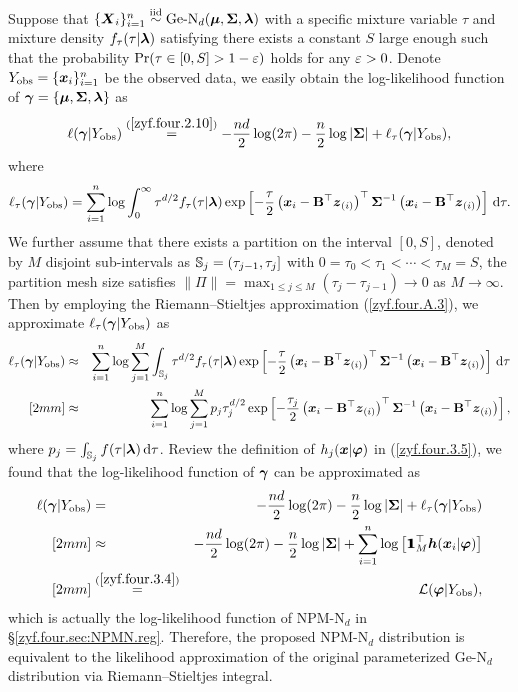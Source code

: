 Suppose that $\{{\boldsymbol{X}}_i\}_{i=1}^n \stackrel{{\rm iid}}{\sim} \mbox{Ge-N}_d({\boldsymbol{\mu}}, {\mbox{\boldmath$\Sigma$}}, {\boldsymbol{\lambda}})$ with a specific mixture variable $\tau$ and mixture density $f_\tau(\tau|{\boldsymbol{\lambda}})$ satisfying there exists a constant $S$ large enough such that the probability $\Pr(\tau \in [0, S] > 1 - \varepsilon)$ holds for any $\varepsilon > 0$. Denote $Y_{\rm obs} = \{{\boldsymbol{x}}_i\}_{i=1}^n$ be the observed data, we easily obtain the log-likelihood function of ${\boldsymbol{\gamma}} = \{{\boldsymbol{\mu}}, {\mbox{\boldmath$\Sigma$}}, {\boldsymbol{\lambda}}\}$ as
\begin{eqnarray} \label{zyf.four.3.8}
    \ell({\boldsymbol{\gamma}} | Y_{\rm obs}) \stackrel{(\ref{zyf.four.2.10})}{=} -\frac{nd}{2}\log(2\pi) - \frac{n}{2}\log|{\mbox{\boldmath$\Sigma$}}| + \ell_\tau({\boldsymbol{\gamma}} | Y_{\rm obs}),
\end{eqnarray}
where
\begin{eqnarray*}
    \ell_\tau({\boldsymbol{\gamma}} | Y_{\rm obs}) = \sum_{i=1}^n \log \int_0^\infty \tau^{d / 2} f_\tau(\tau|{\boldsymbol{\lambda}}) \exp\left[-\frac{\tau}{2} \left({\boldsymbol{x}}_i - {\bf B}^\top{\boldsymbol{z}}_{(i)} \right)^\top {\mbox{\boldmath$\Sigma$}}^{-1} \left({\boldsymbol{x}}_i - {\bf B}^\top{\boldsymbol{z}}_{(i)} \right)\right] \,\mbox{d} \tau.
\end{eqnarray*}
We further assume that there exists a partition on the interval $[0, S]$, denoted by $M$ disjoint sub-intervals as ${\mathbb{S}}_j = (\tau_{j - 1}, \tau_j]$ with $0 = \tau_0 < \tau_1 < \cdots < \tau_M = S$, the partition mesh size satisfies $\|\Pi\| = \max_{1 \le j \le M} (\tau_j - \tau_{j - 1}) \to 0$ as $M \to \infty$. Then by employing the Riemann--Stieltjes approximation (\ref{zyf.four.A.3}), we approximate $\ell_\tau({\boldsymbol{\gamma}} | Y_{\rm obs})$ as
\begin{eqnarray*}
    \ell_\tau({\boldsymbol{\gamma}} | Y_{\rm obs}) &\approx& \sum_{i=1}^n \log \sum_{j=1}^M \int_{{\mathbb{S}}_j} \tau^{d / 2} f_\tau(\tau|{\boldsymbol{\lambda}}) \exp\left[-\frac{\tau}{2} \left({\boldsymbol{x}}_i - {\bf B}^\top{\boldsymbol{z}}_{(i)} \right)^\top {\mbox{\boldmath$\Sigma$}}^{-1} \left({\boldsymbol{x}}_i - {\bf B}^\top{\boldsymbol{z}}_{(i)} \right)\right] \,\mbox{d} \tau \\ [2mm]
    &\approx& \sum_{i=1}^n \log \sum_{j=1}^M p_j \tau_j^{d / 2} \exp\left[-\frac{\tau_j}{2} \left({\boldsymbol{x}}_i - {\bf B}^\top{\boldsymbol{z}}_{(i)} \right)^\top {\mbox{\boldmath$\Sigma$}}^{-1} \left({\boldsymbol{x}}_i - {\bf B}^\top{\boldsymbol{z}}_{(i)} \right)\right],
\end{eqnarray*}
where $p_j = \int_{{\mathbb{S}}_j} f(\tau|{\boldsymbol{\lambda}}) \,\mbox{d} \tau$. Review the definition of $h_j({\boldsymbol{x}} | {\mbox{\boldmath$\varphi$}})$ in (\ref{zyf.four.3.5}), we found that the log-likelihood function of ${\boldsymbol{\gamma}}$ can be approximated as
\begin{eqnarray*}
    \ell({\boldsymbol{\gamma}} | Y_{\rm obs}) &=& -\frac{nd}{2}\log(2\pi) - \frac{n}{2}\log|{\mbox{\boldmath$\Sigma$}}| + \ell_\tau({\boldsymbol{\gamma}} | Y_{\rm obs}) \\ [2mm]
    &\approx& -\frac{nd}{2}\log(2\pi) - \frac{n}{2}\log|{\mbox{\boldmath$\Sigma$}}| + \sum_{i=1}^n \log \left[{\bf 1}\!\!\!{\bf 1}_M^\top {\boldsymbol{h}}({\boldsymbol{x}}_i | {\mbox{\boldmath$\varphi$}}) \right] \\ [2mm]
    &\stackrel{(\ref{zyf.four.3.4})}{=}& \mathcal{L}({\mbox{\boldmath$\varphi$}} | Y_{\rm obs}),
\end{eqnarray*}
which is actually the log-likelihood function of NPM-N$_d$ in \S\ref{zyf.four.sec:NPMN.reg}. Therefore, the proposed NPM-N$_d$ distribution is equivalent to the likelihood approximation of the original parameterized Ge-N$_d$ distribution via Riemann--Stieltjes integral.